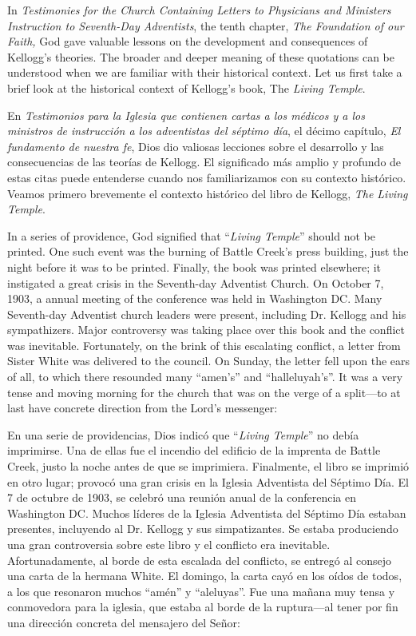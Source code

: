 



In \textit{Testimonies for the Church Containing Letters to Physicians and Ministers Instruction to Seventh-Day Adventists}, the tenth chapter, \textit{The Foundation of our Faith,} God gave valuable lessons on the development and consequences of Kellogg's theories. The broader and deeper meaning of these quotations can be understood when we are familiar with their historical context. Let us first take a brief look at the historical context of Kellogg's book, The \textit{Living Temple}.


En \textit{Testimonios para la Iglesia que contienen cartas a los médicos y a los ministros de instrucción a los adventistas del séptimo día}, el décimo capítulo, \textit{El fundamento de nuestra fe}, Dios dio valiosas lecciones sobre el desarrollo y las consecuencias de las teorías de Kellogg. El significado más amplio y profundo de estas citas puede entenderse cuando nos familiarizamos con su contexto histórico. Veamos primero brevemente el contexto histórico del libro de Kellogg, \textit{The Living Temple}.


In a series of providence, God signified that “\textit{Living Temple}” should not be printed. One such event was the burning of Battle Creek's press building, just the night before it was to be printed. Finally, the book was printed elsewhere; it instigated a great crisis in the Seventh-day Adventist Church. On October 7, 1903, a annual meeting of the conference was held in Washington DC. Many Seventh-day Adventist church leaders were present, including Dr. Kellogg and his sympathizers. Major controversy was taking place over this book and the conflict was inevitable. Fortunately, on the brink of this escalating conflict, a letter from Sister White was delivered to the council. On Sunday, the letter fell upon the ears of all, to which there resounded many “amen's” and “halleluyah's”. It was a very tense and moving morning for the church that was on the verge of a split—to at last have concrete direction from the Lord's messenger:


En una serie de providencias, Dios indicó que “\textit{Living Temple}” no debía imprimirse. Una de ellas fue el incendio del edificio de la imprenta de Battle Creek, justo la noche antes de que se imprimiera. Finalmente, el libro se imprimió en otro lugar; provocó una gran crisis en la Iglesia Adventista del Séptimo Día. El 7 de octubre de 1903, se celebró una reunión anual de la conferencia en Washington DC. Muchos líderes de la Iglesia Adventista del Séptimo Día estaban presentes, incluyendo al Dr. Kellogg y sus simpatizantes. Se estaba produciendo una gran controversia sobre este libro y el conflicto era inevitable. Afortunadamente, al borde de esta escalada del conflicto, se entregó al consejo una carta de la hermana White. El domingo, la carta cayó en los oídos de todos, a los que resonaron muchos “amén” y “aleluyas”. Fue una mañana muy tensa y conmovedora para la iglesia, que estaba al borde de la ruptura—al tener por fin una dirección concreta del mensajero del Señor:


